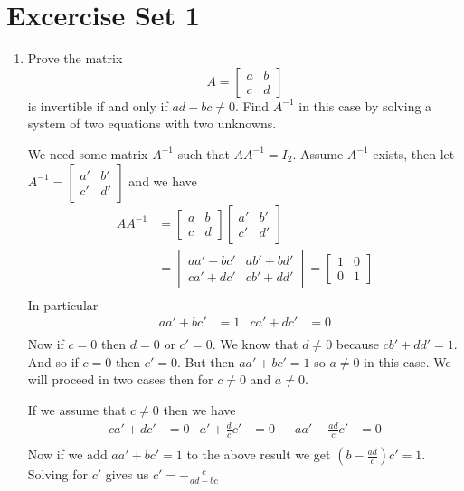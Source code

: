\documentclass[letterpaper]{article}
\begin{document}
\section*{Excercise Set 1}
\begin{enumerate}
\item
Prove the matrix
\[A=\left[\begin{array}{cc}a&b\\c&d\end{array}\right]\]
is invertible if and only if $ad-bc\ne 0$. Find $A^{-1}$ in this case by solving a system of two equations with two unknowns.

We need some matrix $A^{-1}$ such that $AA^{-1}=I_2$.
Assume $A^{-1}$ exists, then let $A^{-1}=\left[\begin{array}{cc}a'&b'\\c'&d'\end{array}\right]$ and we have
\begin{align*}
  AA^{-1}&= \left[\begin{array}{cc}a&b\\c&d\end{array}\right]
            \left[\begin{array}{cc}a'&b'\\c'&d'\end{array}\right]\\
  &=\left[\begin{array}{cc}aa'+bc'&ab'+bd'\\ca'+dc'&cb'+dd'\end{array}\right]
  =\left[\begin{array}{cc}1&0\\0&1\end{array}\right]\\
\end{align*}
In particular
\begin{align*}
  aa'+bc'&=1&
  ca'+dc'&=0\\
\end{align*}
Now if $c=0$ then $d=0$ or $c'=0$. We know that $d\ne 0$ because $cb'+dd'=1$. And so if $c=0$ then $c'=0$. But then $aa'+bc'=1$ so $a\ne 0$ in this case. We will proceed in two cases then for $c\ne 0$ and $a\ne 0$.

If we assume that $c\ne 0$ then we have
\begin{align*}
  ca'+dc'&=0&
  a'+\frac{d}{c}c'&=0&
  -aa'-\frac{ad}{c}c'&=0\\
\end{align*}
Now if we add $aa'+bc'=1$ to the above result we get $\left(b-\frac{ad}{c}\right)c'=1$. Solving for $c'$ gives us $c'=-\frac{c}{ad-bc}$


\end{enumerate}
\end{document}
